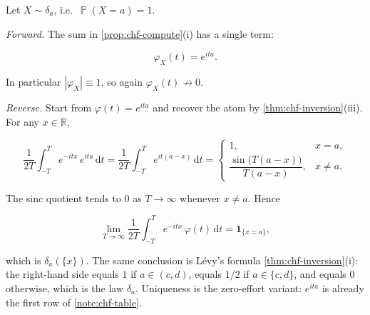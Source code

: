 \documentclass[11pt,a4paper]{article}
\DeclareMathOperator{\Pbb}{\mathbb{P}}
\begin{document}
\begin{example}
\label{ex:chf-dirac}
Let \(X\sim\delta_{a}\), i.e.\ \(\Pbb(X=a)=1\).

\emph{Forward.} The sum in \cref{prop:chf-compute}(i) has a single term:

\[
\varphi_{X}(t)
=
e^{ita}.
\]

In particular \(|\varphi_{X}|\equiv 1\), so again \(\varphi_{X}(t)\not\to 0\).

\emph{Reverse.} Start from \(\varphi(t)=e^{ita}\) and recover the atom by \cref{thm:chf-inversion}(iii). For any \(x\in\mathbb{R}\),

\[
\frac{1}{2T}
\int_{-T}^{T} e^{-itx}\,e^{ita}\,\mathrm{d}t
=
\frac{1}{2T}
\int_{-T}^{T} e^{it(a-x)}\,\mathrm{d}t
=
\begin{cases}
1, & x=a,\\[0.35em]
\dfrac{\sin\bigl(T(a-x)\bigr)}{T(a-x)}, & x\neq a.
\end{cases}
\]

The sinc quotient tends to \(0\) as \(T\to\infty\) whenever \(x\neq a\). Hence

\[
\lim_{T\to\infty}
\frac{1}{2T}
\int_{-T}^{T} e^{-itx}\,\varphi(t)\,\mathrm{d}t
=
\mathbf{1}_{\{x=a\}},
\]

which is \(\delta_{a}(\{x\})\). The same conclusion is L\'evy's formula \cref{thm:chf-inversion}(i): the right-hand side equals \(1\) if \(a\in(c,d)\), equals \(1/2\) if \(a\in\{c,d\}\), and equals \(0\) otherwise, which is the law \(\delta_{a}\). Uniqueness is the zero-effort variant: \(e^{ita}\) is already the first row of \cref{note:chf-table}.
\end{example}
\end{document}
